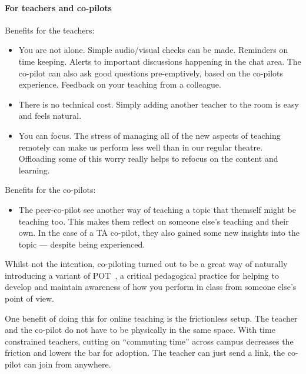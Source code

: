 \documentclass[sigconf]{acmart}
\begin{document}
\paragraph{For teachers and co-pilots}

Benefits for the teachers:

\begin{itemize}
  \item You are not alone. Simple audio/visual checks can be made. Reminders on 
    time keeping. Alerts to important discussions happening in the chat area.
    The co-pilot can also ask good questions pre-emptively, based on the co-pilots experience.
    Feedback on your teaching from a colleague.

  \item There is no technical cost. Simply adding another teacher to the room 
    is easy and feels natural.

  \item You can focus. The stress of managing all of the new aspects of 
    teaching remotely can make us perform less well than in our regular 
    theatre. Offloading some of this worry really helps to refocus on the 
    content and learning.
\end{itemize}

Benefits for the co-pilots:

\begin{itemize}
  \item The peer-co-pilot see another way of teaching a topic that themself 
    might be teaching too.
    This makes them reflect on someone else's teaching and their own.
    In the case of a TA co-pilot, they also gained some new insights into the
    topic --- despite being experienced.
\end{itemize}

Whilst not the intention, co-piloting turned out to be a great way of naturally 
introducing a variant of 
\ac{POT}~\cite[\cf][]{PeerObservation,ReflectivePeerObservation},
a critical 
pedagogical practice for helping to develop and maintain awareness of how you 
perform in class from someone else's point of view.

One benefit of doing this for online teaching is the frictionless setup. The 
teacher and the co-pilot do not have to be physically in the same space.
With time constrained teachers, cutting on \enquote{commuting time} across 
campus decreases the friction and lowers the bar for adoption.
The teacher can just send a link, the co-pilot can join from anywhere.
\end{document}
